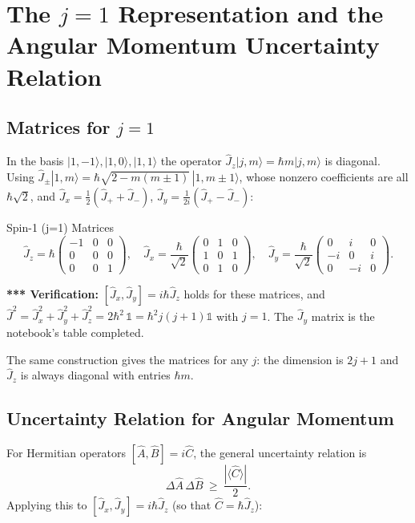 \documentclass[11pt,a4paper]{article}
\begin{document}
\section{The \texorpdfstring{$j=1$}{j=1} Representation and the Angular Momentum Uncertainty Relation}
\label{sy:sec:j1}

\subsection{Matrices for \texorpdfstring{$j=1$}{j=1}}
In the basis $|1,-1\rangle,|1,0\rangle,|1,1\rangle$ the operator $\hat J_z|j,m\rangle=\hbar m|j,m\rangle$ is diagonal. Using $\hat J_\pm|1,m\rangle=\hbar\sqrt{2-m(m\pm1)}\,|1,m\pm1\rangle$, whose nonzero coefficients are all $\hbar\sqrt2$, and $\hat J_x=\tfrac12(\hat J_++\hat J_-)$, $\hat J_y=\tfrac1{2i}(\hat J_+-\hat J_-)$:

\begin{thm}{Spin-1 (j=1) Matrices}
\[
\hat J_z=\hbar\begin{pmatrix}-1&0&0\\0&0&0\\0&0&1\end{pmatrix},\quad
\hat J_x=\frac\hbar{\sqrt2}\begin{pmatrix}0&1&0\\1&0&1\\0&1&0\end{pmatrix},\quad
\hat J_y=\frac\hbar{\sqrt2}\begin{pmatrix}0&i&0\\-i&0&i\\0&-i&0\end{pmatrix}.
\]
\end{thm}

\textbf{*** Verification:} $[\hat J_x,\hat J_y]=i\hbar\hat J_z$ holds for these matrices, and $\hat J^2=\hat J_x^2+\hat J_y^2+\hat J_z^2=2\hbar^2\,\mathbb 1=\hbar^2j(j+1)\mathbb 1$ with $j=1$. The $\hat J_y$ matrix is the notebook's table completed.

The same construction gives the matrices for any $j$: the dimension is $2j+1$ and $\hat J_z$ is always diagonal with entries $\hbar m$.

\subsection{Uncertainty Relation for Angular Momentum}
For Hermitian operators $[\hat A,\hat B]=i\hat C$, the general uncertainty relation is
\[
\Delta\hat A\,\Delta\hat B\ \ge\ \frac{|\langle\hat C\rangle|}2 .
\]
Applying this to $[\hat J_x,\hat J_y]=i\hbar\hat J_z$ (so that $\hat C=\hbar\hat J_z$):
\end{document}
